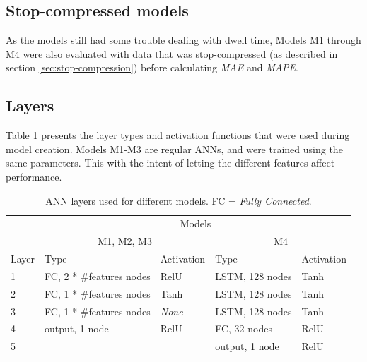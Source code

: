 \subsection{Stop-compressed models}
As the models still had some trouble dealing with dwell time, Models M1 through M4 were also evaluated with data that was stop-compressed (as described in section \ref{sec:stop-compression}) before calculating \textit{MAE} and \textit{MAPE}. 

\subsection{Layers}
Table \ref{tbl:nn-layers} presents the layer types and activation functions that were used during model creation. Models M1-M3 are regular ANNs, and were trained using the same parameters. This with the intent of letting the different features affect performance.

\begin{table}[h]
  \centering
  \caption{ANN layers used for different models. FC = \textit{Fully Connected}.}
  \label{tbl:nn-layers}
  \begin{tabular}{l|l|l|l|l}
        & \multicolumn{4}{c}{Models}                                                                                           \\ \cline{2-5} 
        & \multicolumn{2}{c|}{M1, M2, M3}                           & \multicolumn{2}{c}{M4}                                   \\ \hline
  Layer & Type                     & Activation                     & Type                     & Activation                     \\ \hline
  1     & FC, 2 * \#features nodes & RelU                           & LSTM, 128 nodes          & Tanh                        \\
  2     & FC, 1 * \#features nodes & Tanh                           & LSTM, 128 nodes          & Tanh                        \\
  3     & FC, 1 * \#features nodes & \textit{None} & LSTM, 128 nodes          & Tanh                        \\
  4     & output, 1 node           & RelU                           & FC, 32 nodes & RelU                           \\
  5     &                          &                                & output, 1 node           & RelU
  \end{tabular}
  \end{table}

